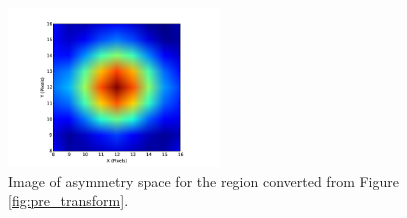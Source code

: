 \documentclass{article}
\begin{document}
\begin{figure}
  \centering
  \includegraphics[width=0.5\textwidth]{f6.png}
  \caption{Image of asymmetry space for the region converted from
    Figure \ref{fig:pre_transform}.}
  \label{fig:asym_space}
\end{figure}
\end{document}
